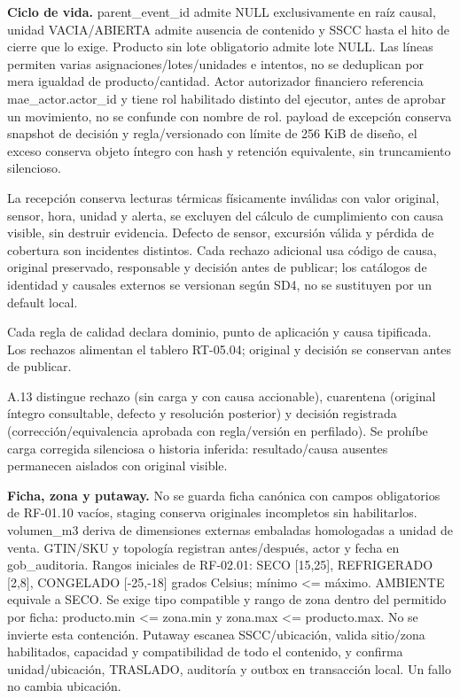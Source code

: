 \textbf{Ciclo de vida.} parent\_event\_id admite NULL exclusivamente en raíz causal, unidad VACIA/ABIERTA admite ausencia de contenido y SSCC hasta el hito de cierre que lo exige. Producto sin lote obligatorio admite lote NULL. Las líneas permiten varias asignaciones/lotes/unidades e intentos, no se deduplican por mera igualdad de producto/cantidad. Actor autorizador financiero referencia mae\_actor.actor\_id y tiene rol habilitado distinto del ejecutor, antes de aprobar un movimiento, no se confunde con nombre de rol. payload de excepción conserva snapshot de decisión y regla/versionado con límite de 256 KiB de diseño, el exceso conserva objeto íntegro con hash y retención equivalente, sin truncamiento silencioso.

La recepción conserva lecturas térmicas físicamente inválidas con valor original, sensor, hora, unidad y alerta, se excluyen del cálculo de cumplimiento con causa visible, sin destruir evidencia. Defecto de sensor, excursión válida y pérdida de cobertura son incidentes distintos. Cada rechazo adicional usa código de causa, original preservado, responsable y decisión antes de publicar; los catálogos de identidad y causales externos se versionan según SD4, no se sustituyen por un default local.

Cada regla de calidad declara dominio, punto de aplicación y causa tipificada. Los rechazos alimentan el tablero RT-05.04; original y decisión se conservan antes de publicar.



A.13 distingue rechazo (sin carga y con causa accionable), cuarentena (original íntegro consultable, defecto y resolución posterior) y decisión registrada (corrección/equivalencia aprobada con regla/versión en perfilado). Se prohíbe carga corregida silenciosa o historia inferida: resultado/causa ausentes permanecen aislados con original visible.

\textbf{Ficha, zona y putaway.} No se guarda ficha canónica con campos obligatorios de RF-01.10 vacíos, staging conserva originales incompletos sin habilitarlos. volumen\_m3 deriva de dimensiones externas embaladas homologadas a unidad de venta. GTIN/SKU y topología registran antes/después, actor y fecha en gob\_auditoria. Rangos iniciales de RF-02.01: SECO [15,25], REFRIGERADO [2,8], CONGELADO [-25,-18] grados Celsius; mínimo <= máximo. AMBIENTE equivale a SECO. Se exige tipo compatible y rango de zona dentro del permitido por ficha: producto.min <= zona.min y zona.max <= producto.max. No se invierte esta contención. Putaway escanea SSCC/ubicación, valida sitio/zona habilitados, capacidad y compatibilidad de todo el contenido, y confirma unidad/ubicación, TRASLADO, auditoría y outbox en transacción local. Un fallo no cambia ubicación.

